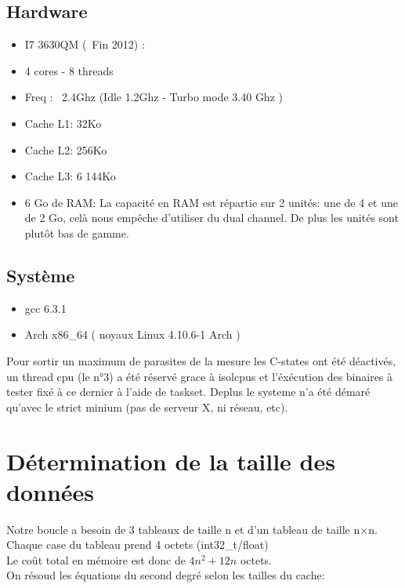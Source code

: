 \documentclass[a4paper]{report}
\begin{document}
\subsection*{Hardware}

\begin{itemize}
    \item{I7 3630QM (~Fin 2012) :}
    \item{4 cores - 8 threads}
    \item{Freq : ~2.4Ghz (Idle 1.2Ghz - Turbo mode 3.40 Ghz )}
    \item{Cache L1: 32Ko}
    \item{Cache L2: 256Ko}
    \item{Cache L3: 6 144Ko}
    \item{6 Go de RAM:  La capacité en RAM est répartie sur 2 unités: une de 4 et une de 2 Go, celà nous empêche d'utiliser du dual channel. De plus les unités sont plutôt bas de gamme.}
\end{itemize}

\subsection*{Système}

\begin{itemize}
    \item{gcc 6.3.1}
    \item{Arch x86\_64 ( noyaux Linux 4.10.6-1 Arch )}
\end{itemize}
     Pour sortir un maximum de parasites de la mesure les C-states ont été déactivés, un thread cpu (le n°3) a été réservé grace à isolcpus et l'éxécution des binaires à tester fixé à ce dernier à l'aide de taskset. Deplus le systeme n'a été démaré qu'avec le strict minium (pas de serveur X, ni réseau, etc).

\section*{Détermination de la taille des données}

Notre boucle a besoin de 3 tableaux de taille n et d'un tableau de taille n$\times$n.\\
Chaque case du tableau prend 4 octets (int32\_t/float)\\
Le coût total en mémoire est donc de $4n^2+12n$ octets.\\

On résoud les équations du second degré selon les tailles du cache:\\
\end{document}
